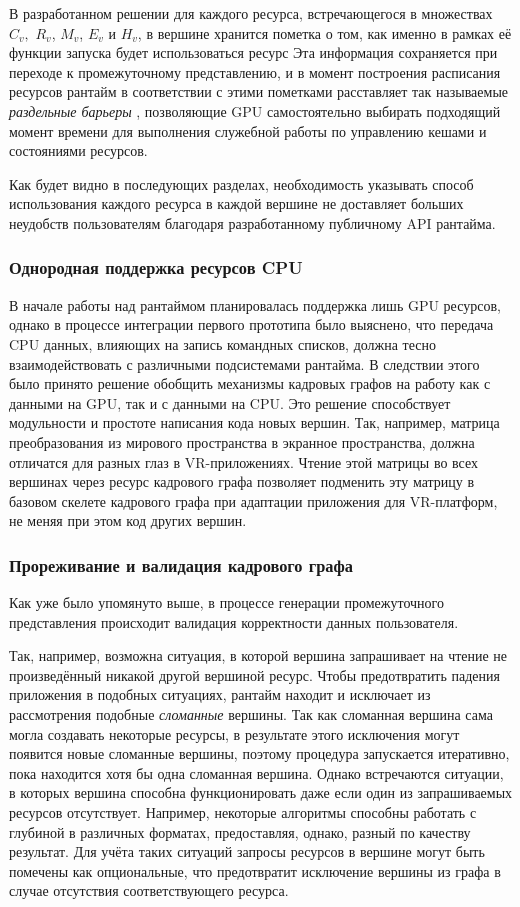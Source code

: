 В разработанном решении для каждого ресурса, встречающегося в множествах $C_v,$ $R_v$, $M_v$, $E_v$ и $H_v$, в вершине хранится пометка о том, как именно в рамках её функции запуска будет использоваться ресурс
Эта информация сохраняется при переходе к промежуточному представлению, и в момент построения расписания ресурсов рантайм в соответствии с этими пометками расставляет так называемые \textit{раздельные барьеры} \cite[раздел~7.5]{VulkanSpec}, позволяющие GPU самостоятельно выбирать подходящий момент времени для выполнения служебной работы по управлению кешами и состояниями ресурсов.

Как будет видно в последующих разделах, необходимость указывать способ использования каждого ресурса в каждой вершине не доставляет больших неудобств пользователям благодаря разработанному публичному API рантайма.

\subsubsection{Однородная поддержка ресурсов CPU}
В начале работы над рантаймом планировалась поддержка лишь GPU ресурсов, однако в процессе интеграции первого прототипа было выяснено, что передача CPU данных, влияющих на запись командных списков, должна тесно взаимодействовать с различными подсистемами рантайма.
В следствии этого было принято решение обобщить механизмы кадровых графов на работу как с данными на GPU, так и с данными на CPU.
Это решение способствует модульности и простоте написания кода новых вершин.
Так, например, матрица преобразования из мирового пространства в экранное пространства, должна отличатся для разных глаз в VR-приложениях.
Чтение этой матрицы во всех вершинах через ресурс кадрового графа позволяет подменить эту матрицу в базовом скелете кадрового графа при адаптации приложения для VR-платформ, не меняя при этом код других вершин.

\subsubsection{Прореживание и валидация кадрового графа}
Как уже было упомянуто выше, в процессе генерации промежуточного представления происходит валидация корректности данных пользователя.

Так, например, возможна ситуация, в которой вершина запрашивает на чтение не произведённый никакой другой вершиной ресурс.
Чтобы предотвратить падения приложения в подобных ситуациях, рантайм находит и исключает из рассмотрения подобные \textit{сломанные} вершины.
Так как сломанная вершина сама могла создавать некоторые ресурсы, в результате этого исключения могут появится новые сломанные вершины, поэтому процедура запускается итеративно, пока находится хотя бы одна сломанная вершина. Однако встречаются ситуации, в которых вершина способна функционировать даже если один из запрашиваемых ресурсов отсутствует. Например, некоторые алгоритмы способны работать с глубиной в различных форматах, предоставляя, однако, разный по качеству результат. Для учёта таких ситуаций запросы ресурсов в вершине могут быть помечены как опциональные, что предотвратит исключение вершины из графа в случае отсутствия соответствующего ресурса.


